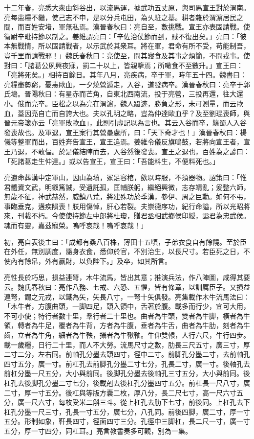 \begin{pinyinscope}
十二年春，亮悉大衆由斜谷出，以流馬運，據武功五丈原，與司馬宣王對於渭南。亮每患糧不繼，使己志不申，是以分兵屯田，為乆駐之基。耕者雜於渭濵居民之間，而百姓安堵，軍無私焉。漢晉春秋曰：亮自至，數挑戰。宣王亦表固請戰。使衞尉辛毗持節以制之。姜維謂亮曰：「辛佐治仗節而到，賊不復出矣。」亮曰：「彼本無戰情，所以固請戰者，以示武於其衆耳。將在軍，君命有所不受，苟能制吾，豈千里而請戰邪！」魏氏春秋曰：亮使至，問其寢食及其事之煩簡，不問戎事。使對曰：「諸葛公夙興夜寐，罰二十以上，皆親擥焉；所噉食不至數升。」宣王曰：「亮將死矣。」相持百餘日。其年八月，亮疾病，卒于軍，時年五十四。魏書曰：亮糧盡勢窮，憂恚歐血，一夕燒營遁走，入谷，道發病卒。漢晉春秋曰：亮卒于郭氏塢。晉陽秋曰：有星赤而芒角，自東北西南流，投于亮營，三投再還，往大還小。俄而亮卒。臣松之以為亮在渭濵，魏人躡迹，勝負之形，未可測量，而云歐血，蓋因亮自亡而自誇大也。夫以孔明之略，豈為仲達歐血乎？及至劉琨喪師，與晉元帝箋亦云「亮軍敗歐血」，此則引虛記以為言也。其云入谷而卒，緣蜀人入谷發喪故也。及軍退，宣王案行其營壘處所，曰：「天下奇才也！」漢晉春秋曰：楊儀等整軍而出，百姓奔告宣王，宣王追焉。姜維令儀反旗鳴鼓，若將向宣王者，宣王乃退，不敢偪。於是儀結陣而去，入谷然後發喪。宣王之退也，百姓為之諺曰：「死諸葛走生仲達。」或以告宣王，宣王曰：「吾能料生，不便料死也。」

亮遺命葬漢中定軍山，因山為墳，冢足容棺，歛以時服，不須器物。詔策曰：「惟君體資文武，明叡篤誠，受遺託孤，匡輔朕躬，繼絕興微，志存靖亂；爰整六師，無歲不征，神武赫然，威鎮八荒，將建殊功於季漢，參伊、周之巨勳。如何不弔，事臨垂克，遘疾隕喪！朕用傷悼，肝心若裂。夫崇德序功，紀行命謚，所以光昭將來，刊載不朽。今使使持節左中郎將杜瓊，贈君丞相武鄉侯印綬，謚君為忠武侯。魂而有靈，嘉茲寵榮。嗚呼哀哉！嗚呼哀哉！」

初，亮自表後主曰：「成都有桑八百株，薄田十五頃，子弟衣食自有餘饒。至於臣在外任，無別調度，隨身衣食，悉仰於官，不別治生，以長尺寸。若臣死之日，不使內有餘帛，外有贏財，以負陛下。」及卒，如其所言。

亮性長於巧思，損益連弩，木牛流馬，皆出其意；推演兵法，作八陣圖，咸得其要云。魏氏春秋曰：亮作八務、七戒、六恐、五懼，皆有條章，以訓厲臣子。又損益連弩，謂之元戎，以鐵為矢，矢長八寸，一弩十矢俱發。亮集載作木牛流馬法曰：「木牛者，方腹曲頭，一脚四足，頭入領中，舌著於腹。載多而行少，宜可大用，不可小使；特行者數十里，羣行者二十里也。曲者為牛頭，雙者為牛脚，橫者為牛領，轉者為牛足，覆者為牛背，方者為牛腹，垂者為牛舌，曲者為牛肋，刻者為牛齒，立者為牛角，細者為牛鞅，攝者為牛鞦䩜。牛仰雙轅，人行六尺，牛行四步。載一歲糧，日行二十里，而人不大勞。流馬尺寸之數，肋長三尺五寸，廣三寸，厚二寸二分，左右同。前軸孔分墨去頭四寸，徑中二寸。前脚孔分墨二寸，去前軸孔四寸五分，廣一寸。前杠孔去前脚孔分墨二寸七分，孔長二寸，廣一寸。後軸孔去前杠分墨一尺五分，大小與前同。後脚孔分墨去後軸孔三寸五分，大小與前同。後杠孔去後脚孔分墨二寸七分，後載剋去後杠孔分墨四寸五分。前杠長一尺八寸，廣二寸，厚一寸五分。後杠與等版方囊二枚，厚八分，長二尺七寸，高一尺六寸五分，廣一尺六寸，每枚受米二斛三斗。從上杠孔去肋下七寸，前後同。上杠孔去下杠孔分墨一尺三寸，孔長一寸五分，廣七分，八孔同。前後四脚，廣二寸，厚一寸五分。形制如象，靬長四寸，徑面四寸三分。孔徑中三脚杠，長二尺一寸，廣一寸五分，厚一寸四分，同杠耳。」亮言教書奏多可觀，別為一集。


\end{pinyinscope}
